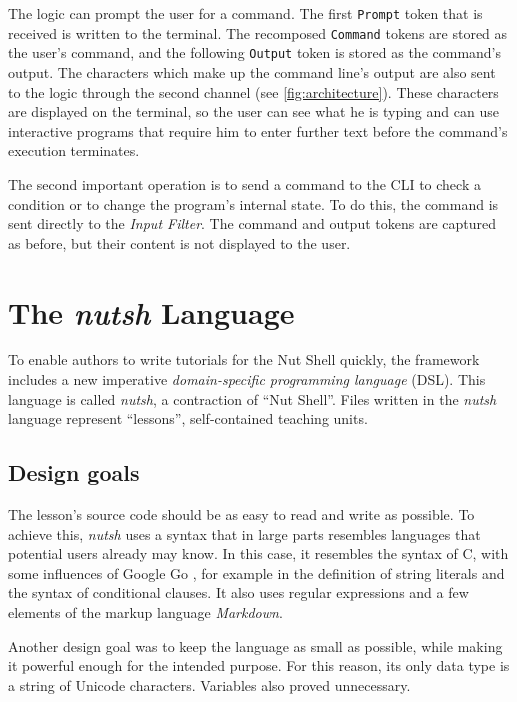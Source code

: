 \documentclass[paper=a4,twoside,abstract=on,cleardoublepage=empty,numbers=noenddot,toc=bib,12pt,appendixprefix=true]{scrreprt}
\begin{document}
The logic can prompt the user for a command. The first \texttt{Prompt} token that is received is written to the terminal. The recomposed \texttt{Command} tokens are stored as the user's command, and the following \texttt{Output} token is stored as the command's output. The characters which make up the command line's output are also sent to the logic through the second channel (see \cref{fig:architecture}). These characters are displayed on the terminal, so the user can see what he is typing and can use interactive programs that require him to enter further text before the command's execution terminates.

The second important operation is to send a command to the \textsc{CLI} to check a condition or to change the program's internal state. To do this, the command is sent directly to the \emph{Input Filter}. The command and output tokens are captured as before, but their content is not displayed to the user.

\chapter{The \emph{nutsh} Language}
\label{sec:lang}

To enable authors to write tutorials for the Nut Shell quickly, the framework includes a new imperative \emph{domain-specific programming language} (\textsc{DSL}). This language is called \emph{nutsh}, a contraction of “Nut Shell”. Files written in the \emph{nutsh} language represent “lessons”, self-contained teaching units.

\section{Design goals}

The lesson's source code should be as easy to read and write as possible. To achieve this, \emph{nutsh} uses a syntax that in large parts resembles languages that potential users already may know. In this case, it resembles the syntax of C, with some influences of Google Go \cite{google13}, for example in the definition of string literals and the syntax of conditional clauses. It also uses regular expressions and a few elements of the markup language \emph{Markdown}.

Another design goal was to keep the language as small as possible, while making it powerful enough for the intended purpose. For this reason, its only data type is a string of Unicode characters. Variables also proved unnecessary.
\end{document}
